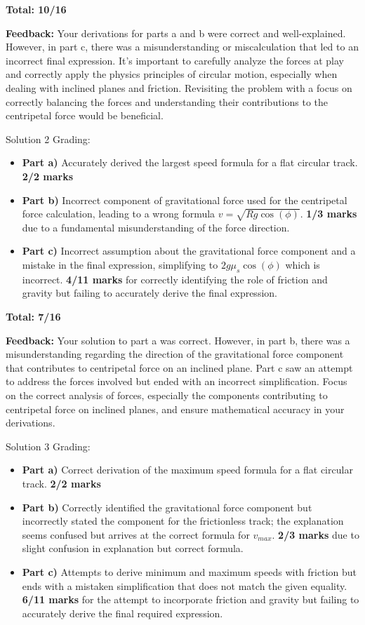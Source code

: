 \documentclass[a4paper,11pt]{article}
\begin{document}
\textbf{Total: 10/16}

\textbf{Feedback:} Your derivations for parts a and b were correct and well-explained. However, in part c, there was a misunderstanding or miscalculation that led to an incorrect final expression. It's important to carefully analyze the forces at play and correctly apply the physics principles of circular motion, especially when dealing with inclined planes and friction. Revisiting the problem with a focus on correctly balancing the forces and understanding their contributions to the centripetal force would be beneficial.

Solution 2 Grading:

\begin{itemize}
    \item \textbf{Part a)} Accurately derived the largest speed formula for a flat circular track. \textbf{2/2 marks}
    \item \textbf{Part b)} Incorrect component of gravitational force used for the centripetal force calculation, leading to a wrong formula \(v = \sqrt{Rg\cos(\phi)}\). \textbf{1/3 marks} due to a fundamental misunderstanding of the force direction.
    \item \textbf{Part c)} Incorrect assumption about the gravitational force component and a mistake in the final expression, simplifying to \(2g\mu_s\cos(\phi)\) which is incorrect. \textbf{4/11 marks} for correctly identifying the role of friction and gravity but failing to accurately derive the final expression.
\end{itemize}

\textbf{Total: 7/16}

\textbf{Feedback:} Your solution to part a was correct. However, in part b, there was a misunderstanding regarding the direction of the gravitational force component that contributes to centripetal force on an inclined plane. Part c saw an attempt to address the forces involved but ended with an incorrect simplification. Focus on the correct analysis of forces, especially the components contributing to centripetal force on inclined planes, and ensure mathematical accuracy in your derivations.

Solution 3 Grading:

\begin{itemize}
    \item \textbf{Part a)} Correct derivation of the maximum speed formula for a flat circular track. \textbf{2/2 marks}
    \item \textbf{Part b)} Correctly identified the gravitational force component but incorrectly stated the component for the frictionless track; the explanation seems confused but arrives at the correct formula for \(v_{max}\). \textbf{2/3 marks} due to slight confusion in explanation but correct formula.
    \item \textbf{Part c)} Attempts to derive minimum and maximum speeds with friction but ends with a mistaken simplification that does not match the given equality. \textbf{6/11 marks} for the attempt to incorporate friction and gravity but failing to accurately derive the final required expression.
\end{itemize}
\end{document}
